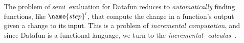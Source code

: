


\noindent
The problem of semi\naive\ evaluation for Datafun reduces to \emph{automatically} finding functions, like $\name{step}'$, that compute the change in a function's output given a change to its input.
%
%
This is a problem of \emph{incremental computation}, and since Datafun is a
functional language, we turn to the \emph{incremental
  \fn-calculus}~\citep{incremental,DBLP:conf/esop/GiarrussoRS19,DBLP:phd/dnb/Giarrusso20}.
